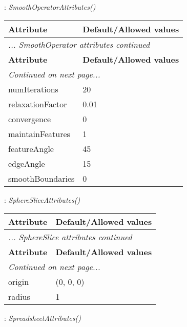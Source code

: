 \documentclass[10pt,a4paper]{report}
\begin{document}
{}
: {\it SmoothOperatorAttributes() }\\[-3mm]

\begin{longtable}{ll}
{\bf Attribute} & {\bf Default/Allowed values} \\
\hline \hline
\endfirsthead
\multicolumn{2}{l}{{\it ... SmoothOperator attributes continued}} \\
{\bf Attribute} & {\bf Default/Allowed values} \\
\hline \hline
\endhead
\hline
\multicolumn{2}{l}{{\it Continued on next page...}} \\
\endfoot
\hline
\endlastfoot

numIterations  &  20 \\
relaxationFactor  &  0.01 \\
convergence  &  0 \\
maintainFeatures  &  1 \\
featureAngle  &  45 \\
edgeAngle  &  15 \\
smoothBoundaries  &  0 \\
\end{longtable}

\newpage

{}
: {\it SphereSliceAttributes() }\\[-3mm]

\begin{longtable}{ll}
{\bf Attribute} & {\bf Default/Allowed values} \\
\hline \hline
\endfirsthead
\multicolumn{2}{l}{{\it ... SphereSlice attributes continued}} \\
{\bf Attribute} & {\bf Default/Allowed values} \\
\hline \hline
\endhead
\hline
\multicolumn{2}{l}{{\it Continued on next page...}} \\
\endfoot
\hline
\endlastfoot

origin  &  (0, 0, 0) \\
radius  &  1 \\
\end{longtable}

\newpage

{}
: {\it SpreadsheetAttributes() }\\[-3mm]
\end{document}
